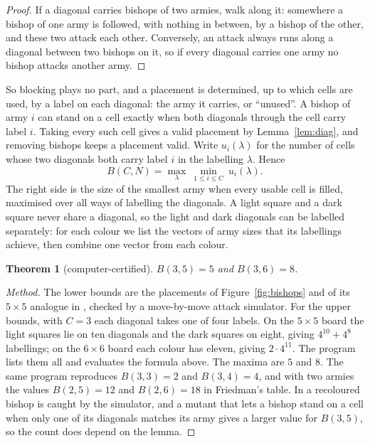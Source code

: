 \documentclass[11pt]{amsart}
\newtheorem{theorem}{Theorem}
\theoremstyle{remark}
\begin{document}
\begin{proof}
If a diagonal carries bishops of two armies, walk along it: somewhere a bishop of one army is
followed, with nothing in between, by a bishop of the other, and these two attack each other.
Conversely, an attack always runs along a diagonal between two bishops on it, so if every diagonal
carries one army no bishop attacks another army.
\end{proof}

So blocking plays no part, and a placement is determined, up to which cells are used, by a label on
each diagonal: the army it carries, or ``unused''. A bishop of army $i$ can stand on a cell exactly
when both diagonals through the cell carry label $i$. Taking every such cell gives a valid placement
by Lemma~\ref{lem:diag}, and removing bishops keeps a placement valid. Write $u_i(\lambda)$ for the number of cells whose two diagonals both carry label $i$ in the
labelling $\lambda$. Hence
\[
B(C,N)=\max_{\lambda}\ \min_{1\le i\le C}\ u_i(\lambda).
\]
The right side is the size of the smallest army when every usable cell is filled, maximised over all
ways of labelling the diagonals. A light square and a dark square never share a diagonal, so the
light and dark diagonals can be labelled separately: for each colour we list the vectors of army sizes
that its labellings achieve, then combine one vector from each colour.

\begin{theorem}[computer-certified]\label{thm:bishops}
$B(3,5)=5$ and $B(3,6)=8$.
\end{theorem}

\begin{proof}[Method]
The lower bounds are the placements of Figure~\ref{fig:bishops} and of its $5\times5$ analogue in
, checked by a move-by-move attack simulator. For the upper
bounds, with $C=3$ each diagonal takes one of four labels. On the $5\times5$ board the light squares
lie on ten diagonals and the dark squares on eight, giving $4^{10}+4^{8}$ labellings; on the
$6\times6$ board each colour has eleven, giving $2\cdot4^{11}$. The program
 lists them all and evaluates the formula above. The maxima are $5$ and
$8$. The same program reproduces $B(3,3)=2$ and $B(3,4)=4$, and with two armies the values
$B(2,5)=12$ and $B(2,6)=18$ in Friedman's table. In  a recoloured bishop is caught
by the simulator, and a mutant that lets a bishop stand on a cell when only one of its diagonals
matches its army gives a larger value for $B(3,5)$, so the count does depend on the lemma.
\end{proof}
\end{document}
